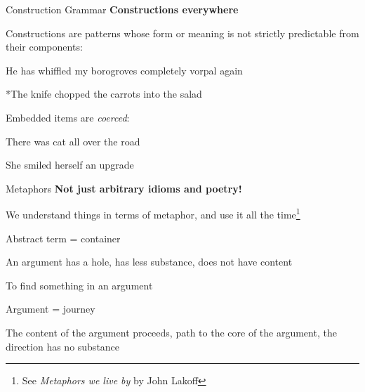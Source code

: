\documentclass[aspectratio=169,cramped]{beamer}
\let\tempone\itemize
\let\temptwo\enditemize
\renewenvironment{itemize}{\tempone\addtolength{\itemsep}{-0\baselineskip}\addtolength{\parskip}{-0.2\baselineskip}}{\temptwo}
\newcommand{\ex}[1]{{\color{teal} #1}}
\begin{document}
\begin{frame}{Construction Grammar}
	\textbf{Constructions everywhere}
  \begin{itemize}
  \item Constructions are patterns whose form or meaning is not strictly predictable from their
    components:
    \begin{itemize}
    \item \ex{He has whiffled my borogroves completely vorpal again}
    \item \ex{*The knife chopped the carrots into the salad}
    \end{itemize}
  \item Embedded items are \emph{coerced}:
    \begin{itemize}
    \item \ex{There was cat all over the road}
    \item \ex{She smiled herself an upgrade}
    \end{itemize}

  \end{itemize}
\end{frame}

\begin{frame}{Metaphors}
	\textbf{Not just arbitrary idioms and poetry!}
\begin{itemize}
  \item We understand things in terms of metaphor, and use it all the time\footnote{See
      \textit{Metaphors we live by} by John Lakoff}
  \item Abstract term = container
    \begin{itemize}
    \item \ex{An argument has a hole, has less substance, does not have content}
    \item \ex{To find something in an argument}
    \end{itemize}
  \item Argument = journey
    \begin{itemize}
    \item \ex{The content of the argument proceeds, path to the core of the argument, the direction
        has no substance}
    \end{itemize}

  \end{itemize}
\end{frame}


\end{document}
